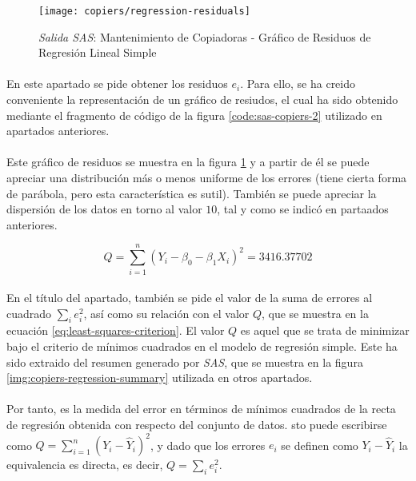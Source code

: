 \documentclass{article}
\begin{document}
        \begin{figure}[H]
          \centering
          \texttt{[image: copiers/regression-residuals]}
          \caption{\emph{Salida SAS}: Mantenimiento de Copiadoras - Gráfico de Residuos de Regresión Lineal Simple}
          \label{img:copiers-regression-residuals}
        \end{figure}

        \paragraph{}
        En este apartado se pide obtener los residuos $e_i$. Para ello, se ha creido conveniente la representación de un gráfico de resiudos, el cual ha sido obtenido mediante el fragmento de código de la figura \ref{code:sas-copiers-2} utilizado en apartados anteriores.

        \paragraph{}
        Este gráfico de residuos se muestra en la figura \ref{img:copiers-regression-residuals} y a partir de él se puede apreciar una distribución más o menos uniforme de los errores (tiene cierta forma de parábola, pero esta característica es sutil). También se puede apreciar la dispersión de los datos en torno al valor $10$, tal y como se indicó en partaados anteriores.

        \begin{equation}
        \label{eq:least-squares-criterion}
          Q = \sum\limits_{i=1}^n(Y_i - \beta_0 - \beta_1X_i)^2 = 3416.37702
        \end{equation}

        \paragraph{}
        En el título del apartado, también se pide el valor de la suma de errores al cuadrado $\sum_i e_i^2$, así como su relación con el valor $Q$, que se muestra en la ecuación \eqref{eq:least-squares-criterion}. El valor $Q$ es aquel que se trata de minimizar bajo el criterio de mínimos cuadrados en el modelo de regresión simple. Este ha sido extraido del resumen generado por \emph{SAS}, que se muestra en la figura \ref{img:copiers-regression-summary} utilizada en otros apartados.

        \paragraph{}
        Por tanto, es la medida del error en términos de mínimos cuadrados de la recta de regresión obtenida con respecto del conjunto de datos. sto puede escribirse como $Q = \sum_{i=1}^n(Y_i - \widehat{Y}_i)^2$, y dado que los errores $e_i$ se definen como $Y_i - \widehat{Y}_i$ la equivalencia es directa, es decir, $Q = \sum_i e_i^2$.
\end{document}
